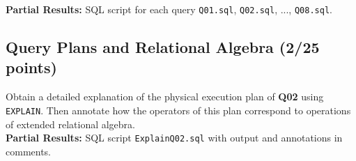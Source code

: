 \documentclass[
        a4paper,
        pdftex,
        english, 
        oneside,%
        listof=totoc,%
        bibliography=totoc, %
        titlepage,
        abstracton 
]{scrartcl} %
\begin{document}
\textbf{Partial Results:} SQL script for each query \texttt{Q01.sql}, \texttt{Q02.sql}, ..., \texttt{Q08.sql}.

\subsection{Query Plans and Relational Algebra (2/25 points)} 
\label{sec:SQL3}

Obtain a detailed explanation of the physical execution plan of \textbf{Q02} using \texttt{EXPLAIN}. Then annotate how the operators of this plan correspond to operations of extended relational algebra.\\

\textbf{Partial Results:} SQL script \texttt{ExplainQ02.sql} with output and annotations in comments. 




\normalsize
\end{document}
